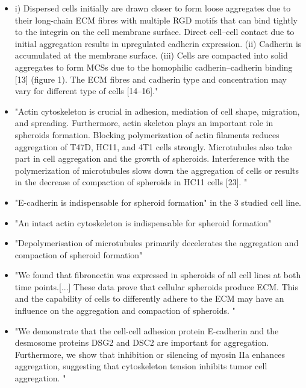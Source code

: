 \documentclass[11pt,a4paper]{article}
\begin{document}
\begin{itemize}
\item i) Dispersed cells initially are drawn closer to form loose aggregates due to their long-chain ECM fibres with multiple RGD motifs that can bind tightly to the integrin on the cell membrane surface. Direct cell–cell contact due to initial aggregation results in upregulated cadherin expression. (ii) Cadherin is accumulated at the membrane surface. (iii) Cells are compacted into solid aggregates to form MCSs due to the homophilic cadherin–cadherin binding [13] (figure 1). The ECM fibres and cadherin type and concentration may vary for different type of cells [14–16]."\cite{Cui2017}

\item  "Actin cytoskeleton is crucial in adhesion, mediation of cell shape, migration, and spreading. Furthermore, actin skeleton plays an important role in spheroids formation. Blocking polymerization of actin filaments reduces aggregation of T47D, HC11, and 4T1 cells strongly. Microtubules also take part in cell aggregation and the growth of spheroids. Interference with the polymerization of microtubules slows down the aggregation of cells or results in the decrease of compaction of spheroids in HC11 cells [23]. "\cite{Bialkowska2020}

\item "E-cadherin is indispensable for spheroid formation" in the 3 studied cell line.\cite{Smyrek2018}

\item "An intact actin cytoskeleton is indispensable for spheroid formation" \cite{Smyrek2018}

\item "Depolymerisation of microtubules primarily decelerates the aggregation and compaction of spheroid formation" \cite{Smyrek2018}

\item "We found that fibronectin was expressed in spheroids of all cell lines at both time points.[...] These data prove that cellular spheroids produce ECM. This and the capability of cells to differently adhere to the ECM may have an influence on the aggregation and compaction of spheroids. "\cite{Smyrek2018}

\item "We demonstrate that the cell-cell adhesion protein E-cadherin and the desmosome proteins DSG2 and DSC2 are important for aggregation. Furthermore, we show that inhibition or silencing of myosin IIa enhances aggregation, suggesting that cytoskeleton tension inhibits tumor cell aggregation. "\cite{Saias2015}


\end{itemize}
\end{document}
